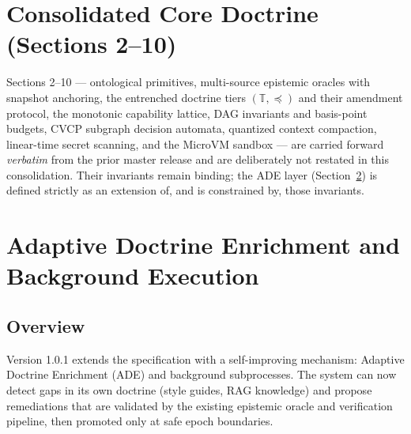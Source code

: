 \documentclass[11pt]{article}
\begin{document}

\section{Consolidated Core Doctrine (Sections 2--10)}
\label{sec:core-carried-forward}
Sections 2--10 --- ontological primitives, multi-source epistemic oracles
with snapshot anchoring, the entrenched doctrine tiers $(\mathbb{T}, \preceq)$
and their amendment protocol, the monotonic capability lattice, DAG
invariants and basis-point budgets, CVCP subgraph decision automata,
quantized context compaction, linear-time secret scanning, and the
MicroVM sandbox --- are carried forward \emph{verbatim} from the prior
master release and are deliberately not restated in this consolidation.
Their invariants remain binding; the ADE layer
(Section~\ref{sec:adaptive_enrichment}) is defined strictly as an extension
of, and is constrained by, those invariants.


\section{Adaptive Doctrine Enrichment and Background Execution}
\label{sec:adaptive_enrichment}

\subsection{Overview}
Version 1.0.1 extends the specification with a self-improving mechanism: Adaptive Doctrine Enrichment (ADE) and background subprocesses. The system can now detect gaps in its own doctrine (style guides, RAG knowledge) and propose remediations that are validated by the existing epistemic oracle and verification pipeline, then promoted only at safe epoch boundaries.
\end{document}
